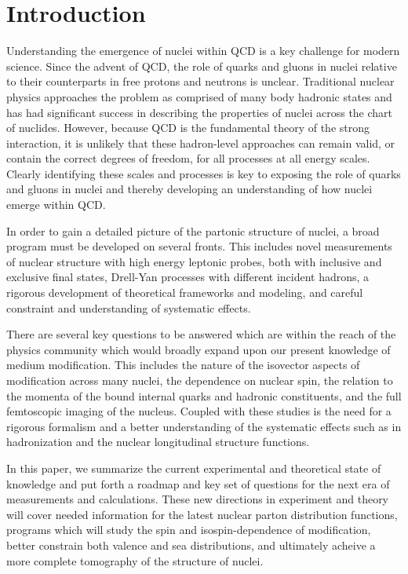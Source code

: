 \section{Introduction}


Understanding the emergence of nuclei within QCD is a key challenge for modern science.  Since the advent of QCD, the role of quarks and gluons in nuclei relative to their counterparts in free protons and neutrons is unclear.  Traditional nuclear physics approaches the problem as comprised of many body hadronic states and has had significant success in describing the properties of nuclei across the chart of nuclides. However, because QCD is the fundamental theory of the strong interaction, it is unlikely that these hadron-level approaches can remain valid, or contain the correct degrees of freedom, for all processes at all energy scales. Clearly identifying these scales and processes is key to exposing the role of quarks and gluons in nuclei and thereby developing an understanding of how nuclei emerge within QCD.

In order to gain a detailed picture of the partonic structure of nuclei, a broad program must be developed on several fronts.  This includes novel measurements of nuclear structure with high energy leptonic probes, both with inclusive and exclusive final states, Drell-Yan processes with different incident hadrons, a rigorous development of theoretical frameworks and modeling, and  careful constraint and understanding of systematic effects.

There are several key questions to be answered which are within the reach of the physics community which would broadly expand upon our present knowledge of medium modification.  This includes the nature of the isovector aspects of modification across many nuclei, the dependence on nuclear spin, the relation to the momenta of the bound internal quarks and hadronic constituents, and the full femtoscopic imaging of the nucleus.  Coupled with these studies is the need for a rigorous formalism and a better understanding of the systematic effects such as in hadronization and the nuclear longitudinal structure functions. 

In this paper, we summarize the current experimental and theoretical state of knowledge and put forth a roadmap and key set of questions for the next era of measurements and calculations.  These new directions in experiment and theory will cover needed information for the latest nuclear parton distribution functions, programs which will study the spin and isospin-dependence of modification, better constrain both valence and sea distributions, and ultimately acheive a more complete tomography of the structure of nuclei.

